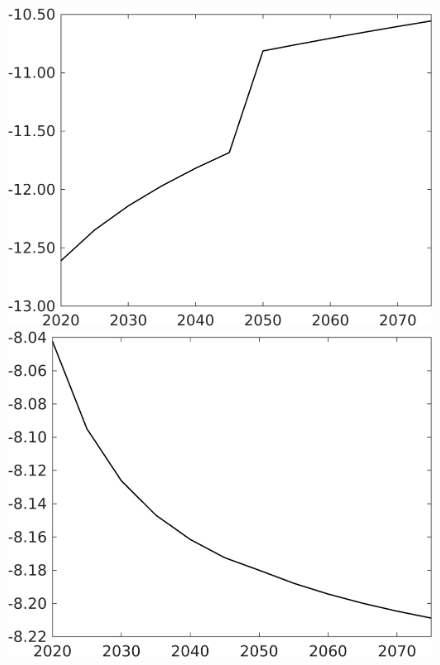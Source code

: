 \documentclass[12pt]{article}
\begin{document}
\begin{figure}[h!!]
\begin{minipage}[]{0.32\textwidth}
	\end{minipage}		
	\begin{minipage}[]{0.32\textwidth}
		\includegraphics[width=1\textwidth]{../../codding_model/own_basedOnFried/optimalPol_010922_revision/figures/all_13Sept22/CompTaufPER_bytaul_Equlab_Reg0_Lg_spillover0_nsk0_xgr0_knspil0_sep1_LFlimit1_emsbase0_countec0_GovRev0_etaa0.79_lgd0.png}
	\end{minipage}
	\begin{minipage}[]{0.32\textwidth}
		\includegraphics[width=1\textwidth]{../../codding_model/own_basedOnFried/optimalPol_010922_revision/figures/all_13Sept22/CompTaufPER_bytaul_Equlab_Reg0_Ln_spillover0_nsk0_xgr0_knspil0_sep1_LFlimit1_emsbase0_countec0_GovRev0_etaa0.79_lgd0.png}

\end{minipage}
\end{figure}
\end{document}
